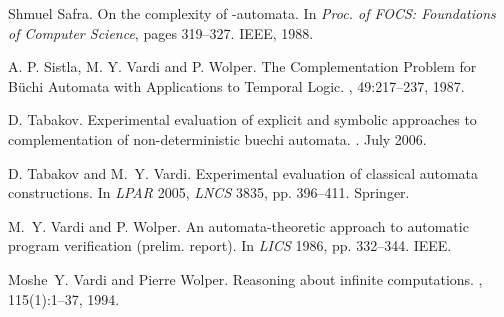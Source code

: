 \documentclass{LMCS}
\begin{document}
\begin{thebibliography}{DDHR06]}
Shmuel Safra.
\newblock On the complexity of -automata.
\newblock In {\em Proc. of FOCS: Foundations of Computer Science}, pages
  319--327. IEEE, 1988.

A. P. Sistla, M. Y. Vardi and P. Wolper.
\newblock The Complementation Problem for B{\"u}chi Automata with Applications to Temporal Logic.
, 49:217--237, 1987.


D. Tabakov.
\newblock Experimental evaluation of explicit and symbolic approaches to
  complementation of non-deterministic buechi automata.
. July 2006.

D. Tabakov and M.~Y. Vardi.
\newblock Experimental evaluation of classical automata constructions.
\newblock In {\em LPAR} 2005, {\em LNCS} 3835, pp. 396--411. Springer.

M.~Y. Vardi and P. Wolper.
\newblock An automata-theoretic approach to automatic program verification
  (prelim. report).
\newblock In {\em LICS} 1986, pp. 332--344. IEEE.

Moshe~Y. Vardi and Pierre Wolper.
\newblock Reasoning about infinite computations.
, 115(1):1--37, 1994.

\end{thebibliography}
\fi
\end{document}
